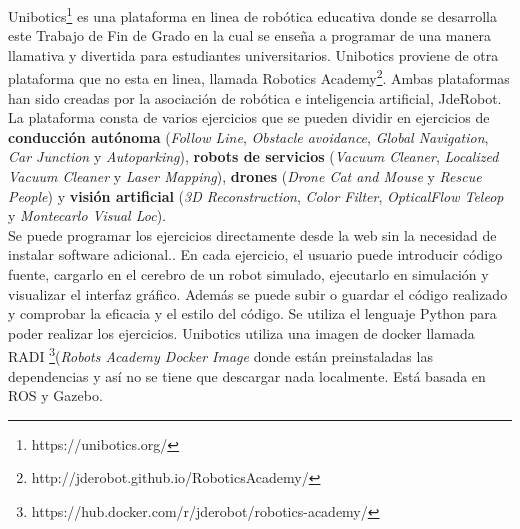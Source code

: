 Unibotics\footnote{https://unibotics.org/} es una plataforma en linea de robótica educativa donde se desarrolla este Trabajo de Fin  de Grado en la cual se enseña a programar de una manera llamativa y divertida para estudiantes universitarios. Unibotics proviene de otra plataforma que no esta en linea, llamada Robotics Academy\footnote{http://jderobot.github.io/RoboticsAcademy/}. Ambas plataformas han sido creadas por la asociación de robótica e  inteligencia artificial, JdeRobot.\\


La plataforma consta de varios ejercicios que se pueden dividir en ejercicios de \textbf{conducción autónoma} (\textit{Follow Line}, \textit{Obstacle avoidance}, \textit{Global Navigation}, \textit{Car Junction} y \textit{Autoparking}), \textbf{robots de servicios }(\textit{Vacuum Cleaner}, \textit{Localized Vacuum Cleaner} y \textit{Laser Mapping}), \textbf{drones} (\textit{Drone Cat and Mouse} y \textit{Rescue People}) y \textbf{visión artificial} (\textit{3D Reconstruction}, \textit{Color Filter}, \textit{OpticalFlow Teleop} y \textit{Montecarlo Visual Loc}).\\

Se puede programar los ejercicios directamente desde la web sin la necesidad de instalar software adicional.. En cada ejercicio, el usuario puede introducir código fuente, cargarlo en el cerebro de un robot simulado, ejecutarlo en simulación y visualizar el interfaz gráﬁco. Además se puede subir o guardar el código realizado y comprobar la eficacia y el estilo del código. Se utiliza el lenguaje Python para poder realizar los ejercicios. Unibotics utiliza una imagen de docker llamada RADI \footnote{https://hub.docker.com/r/jderobot/robotics-academy/}(\textit{Robots Academy Docker Image} donde están preinstaladas las dependencias y así no se tiene que descargar nada localmente. Está basada en ROS y Gazebo\cite{robotics}.\\

